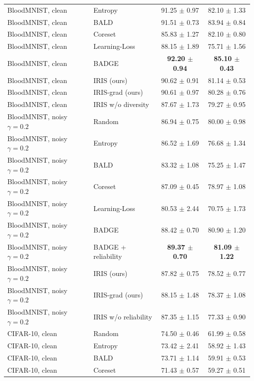 \begin{tabular}{llcc}
BloodMNIST, clean & Entropy & 91.25 $\pm$ 0.97 & 82.10 $\pm$ 1.33 \\
BloodMNIST, clean & BALD & 91.51 $\pm$ 0.73 & 83.94 $\pm$ 0.84 \\
BloodMNIST, clean & Coreset & 85.83 $\pm$ 1.27 & 82.10 $\pm$ 0.80 \\
BloodMNIST, clean & Learning-Loss & 88.15 $\pm$ 1.89 & 75.71 $\pm$ 1.56 \\
BloodMNIST, clean & BADGE & \textbf{92.20 $\pm$ 0.94} & \textbf{85.10 $\pm$ 0.43} \\
BloodMNIST, clean & IRIS (ours) & 90.62 $\pm$ 0.91 & 81.14 $\pm$ 0.53 \\
BloodMNIST, clean & IRIS-grad (ours) & 90.61 $\pm$ 0.97 & 80.28 $\pm$ 0.76 \\
BloodMNIST, clean & IRIS w/o  diversity & 87.67 $\pm$ 1.73 & 79.27 $\pm$ 0.95 \\
\midrule
BloodMNIST, noisy $\gamma{=}0.2$ & Random & 86.94 $\pm$ 0.75 & 80.00 $\pm$ 0.98 \\
BloodMNIST, noisy $\gamma{=}0.2$ & Entropy & 86.52 $\pm$ 1.69 & 76.68 $\pm$ 1.34 \\
BloodMNIST, noisy $\gamma{=}0.2$ & BALD & 83.32 $\pm$ 1.08 & 75.25 $\pm$ 1.47 \\
BloodMNIST, noisy $\gamma{=}0.2$ & Coreset & 87.09 $\pm$ 0.45 & 78.97 $\pm$ 1.08 \\
BloodMNIST, noisy $\gamma{=}0.2$ & Learning-Loss & 80.53 $\pm$ 2.44 & 70.75 $\pm$ 1.73 \\
BloodMNIST, noisy $\gamma{=}0.2$ & BADGE & 88.42 $\pm$ 0.70 & 80.90 $\pm$ 1.20 \\
BloodMNIST, noisy $\gamma{=}0.2$ & BADGE + reliability & \textbf{89.37 $\pm$ 0.70} & \textbf{81.09 $\pm$ 1.22} \\
BloodMNIST, noisy $\gamma{=}0.2$ & IRIS (ours) & 87.82 $\pm$ 0.75 & 78.52 $\pm$ 0.77 \\
BloodMNIST, noisy $\gamma{=}0.2$ & IRIS-grad (ours) & 88.15 $\pm$ 1.48 & 78.37 $\pm$ 1.08 \\
BloodMNIST, noisy $\gamma{=}0.2$ & IRIS w/o  reliability & 87.35 $\pm$ 1.15 & 77.33 $\pm$ 0.90 \\
\midrule
CIFAR-10, clean & Random & 74.50 $\pm$ 0.46 & 61.99 $\pm$ 0.58 \\
CIFAR-10, clean & Entropy & 73.42 $\pm$ 2.41 & 58.92 $\pm$ 1.43 \\
CIFAR-10, clean & BALD & 73.71 $\pm$ 1.14 & 59.91 $\pm$ 0.53 \\
CIFAR-10, clean & Coreset & 71.43 $\pm$ 0.57 & 59.27 $\pm$ 0.51 \\

\end{tabular}

